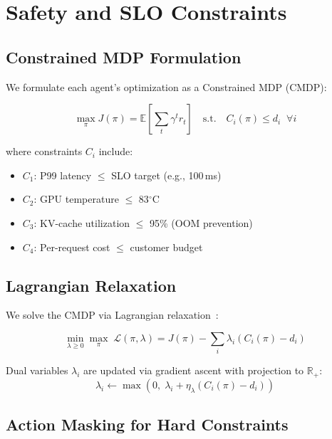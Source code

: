 \documentclass[conference,10pt]{IEEEtran}
\begin{document}
\section{Safety and SLO Constraints}
\label{sec:safety}

\subsection{Constrained MDP Formulation}

We formulate each agent's optimization as a Constrained MDP (CMDP):

\begin{equation}
\max_\pi J(\pi) = \mathbb{E}\left[\sum_t \gamma^t r_t\right] \quad \text{s.t.} \quad C_i(\pi) \leq d_i \;\; \forall i
\end{equation}

where constraints $C_i$ include:
\begin{itemize}
\item $C_1$: P99 latency $\leq$ SLO target (e.g., 100\,ms)
\item $C_2$: GPU temperature $\leq$ 83$^\circ$C
\item $C_3$: KV-cache utilization $\leq$ 95\% (OOM prevention)
\item $C_4$: Per-request cost $\leq$ customer budget
\end{itemize}

\subsection{Lagrangian Relaxation}

We solve the CMDP via Lagrangian relaxation~\cite{tessler2018rcpo}:

\begin{equation}
\min_{\lambda \geq 0} \max_\pi \; \mathcal{L}(\pi, \lambda) = J(\pi) - \sum_i \lambda_i (C_i(\pi) - d_i)
\end{equation}

Dual variables $\lambda_i$ are updated via gradient ascent with projection to $\mathbb{R}_+$:
\begin{equation}
\lambda_i \leftarrow \max(0, \;\lambda_i + \eta_\lambda (C_i(\pi) - d_i))
\end{equation}

\subsection{Action Masking for Hard Constraints}
\end{document}
